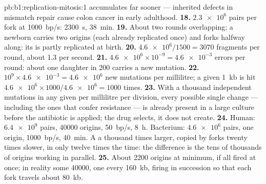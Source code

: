 \begin{solution}{pb:b1:replication-mitosis:1}
accumulates far sooner --- inherited defects in mismatch repair cause
colon cancer in early adulthood.
\textbf{18.} $\num{2.3e6}$ pairs per fork at \qty{1000}{bp/s}:
\qty{2300}{s}, \qty{38}{min}.
\textbf{19.} About two rounds overlapping; a newborn  carries
two origins (each already replicated once) and forks halfway along:
its  is partly replicated at birth.
\textbf{20.} $\num{4.6e6}/1500 = 3070$ fragments per round, about 1.3
per second.
\textbf{21.} $\num{4.6e6}\times 10^{-9} = \num{4.6e-3}$ errors per
round: about one daughter in 200 carries a new mutation.
\textbf{22.} $10^9\times\num{4.6e-3} = \num{4.6e6}$ new mutations per
millilitre; a given \qty{1}{kb}  is hit $\num{4.6e6}\times
1000/\num{4.6e6} = 1000$ times.
\textbf{23.} With a thousand independent mutations in any given 
per millilitre per division, every possible single change --- including
the ones that confer resistance --- is already present in a large
culture before the antibiotic is applied; the drug selects, it does
not create.
\textbf{24.} Human: $\num{6.4e9}$ pairs, \num{40000} origins,
\qty{50}{bp/s}, \qty{8}{h}. Bacterium: $\num{4.6e6}$ pairs, one origin,
\qty{1000}{bp/s}, \qty{40}{min}. A  a thousand times larger,
copied by forks twenty times slower, in only twelve times the time:
the difference is the tens of thousands of origins working in
parallel.
\textbf{25.} About \num{2200} origins at minimum, if all fired at
once; in reality some \num{40000}, one every \qty{160}{kb}, firing in
succession so that each fork travels about \qty{80}{kb}.
\end{solution}
